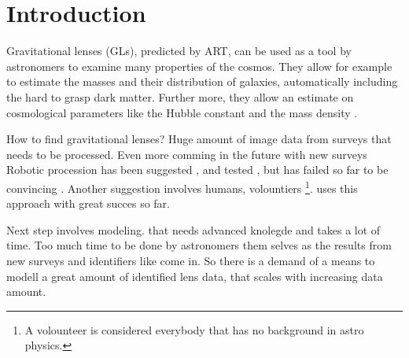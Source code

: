 \section{Introduction}

%
%
%
%
%
%
%
%
%


Gravitational lenses (GLs), predicted by ART, can be used as a tool by astronomers to examine many properties of the cosmos.
They allow for example to estimate the masses and their distribution of galaxies, automatically including the hard to grasp dark matter.
Further more, they allow an estimate on cosmological parameters like the Hubble constant \citep{Saha2006} and the mass density \needcite.


How to find gravitational lenses? Huge amount of image data from surveys that needs to be processed.
Even more comming in the future with new surveys \needcite
Robotic procession has been suggested \needcite, and tested \needcite, but has failed so far to be convincing \needcite.
Another suggestion involves humans, volountiers \footnote{A volounteer is considered everybody that has no background in astro physics.}.
\sw uses this approach with great succes so far.\needcite


Next step involves modeling. that needs advanced knolegde and takes a lot of time.
Too much time to be done by astronomers them selves as the results from new surveys and identifiers like \sw come in.
So there is a demand of a means to modell a great amount of identified lens data, that scales with increasing data amount.


